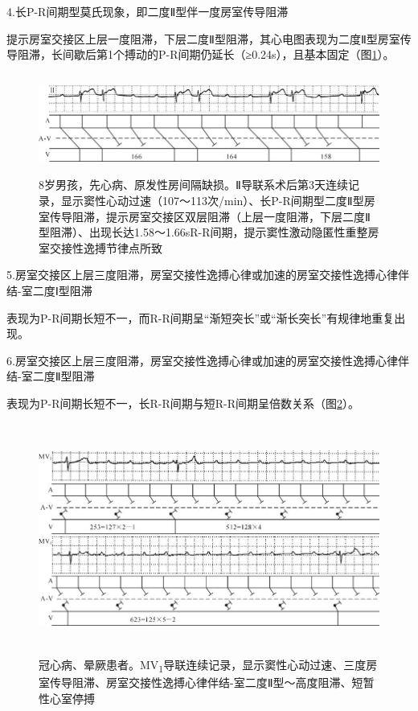 4.长P-R间期型莫氏现象，即二度Ⅱ型伴一度房室传导阻滞

提示房室交接区上层一度阻滞，下层二度Ⅱ型阻滞，其心电图表现为二度Ⅱ型房室传导阻滞，长间歇后第1个搏动的P-R间期仍延长（≥0.24s），且基本固定（图\ref{fig24-5}）。

\begin{figure}[!htbp]
 \centering
 \includegraphics[width=5.76042in,height=1.29167in]{./images/Image00400.jpg}
 \captionsetup{justification=centering}
 \caption{8岁男孩，先心病、原发性房间隔缺损。Ⅱ导联系术后第3天连续记录，显示窦性心动过速（107～113次/min）、长P-R间期型二度Ⅱ型房室传导阻滞，提示房室交接区双层阻滞（上层一度阻滞，下层二度Ⅱ型阻滞）、出现长达1.58～1.66sR-R间期，提示窦性激动隐匿性重整房室交接性逸搏节律点所致}
 \label{fig24-5}
  \end{figure} 

5.房室交接区上层三度阻滞，房室交接性逸搏心律或加速的房室交接性逸搏心律伴结-室二度Ⅰ型阻滞

表现为P-R间期长短不一，而R-R间期呈“渐短突长”或“渐长突长”有规律地重复出现。

6.房室交接区上层三度阻滞，房室交接性逸搏心律或加速的房室交接性逸搏心律伴结-室二度Ⅱ型阻滞

表现为P-R间期长短不一，长R-R间期与短R-R间期呈倍数关系（图\ref{fig24-6}）。

\begin{figure}[!htbp]
 \centering
 \includegraphics[width=5.80208in,height=2.98958in]{./images/Image00401.jpg}
 \captionsetup{justification=centering}
 \caption{冠心病、晕厥患者。MV\textsubscript{1}导联连续记录，显示窦性心动过速、三度房室传导阻滞、房室交接性逸搏心律伴结-室二度Ⅱ型～高度阻滞、短暂性心室停搏}
 \label{fig24-6}
  \end{figure} 


